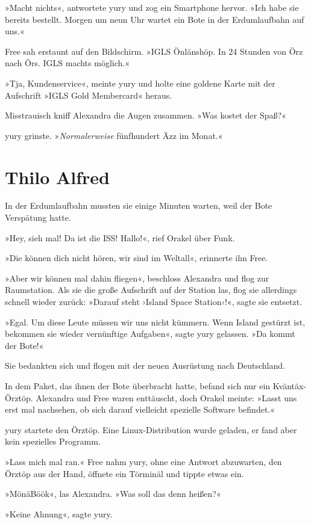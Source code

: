»Macht nichts«, antwortete yury und zog ein Smartphone hervor. »Ich habe sie bereits bestellt. Morgen um neun Uhr wartet ein Bote in der Erdumlaufbahn auf uns.«

Free sah erstaunt auf den Bildschirm. »IGLS Önlänshöp. In 24 Stunden von Örz nach Örs. IGLS machts möglich.«

»Tja, Kundenservice«, meinte yury und holte eine goldene Karte mit der Aufschrift »IGLS Gold Membercard« heraus.

Misstrauisch kniff Alexandra die Augen zusammen. »Was kostet der Spaß?«

yury grinste. »\emph{Normalerweise} fünfhundert Äzz im Monat.«


\chapter{Thilo Alfred}

In der Erdumlaufbahn mussten sie einige Minuten warten, weil der Bote Verspätung hatte.

»Hey, sieh mal! Da ist die ISS! Hallo!«, rief Orakel über Funk.

»Die können dich nicht hören, wir sind im Weltall«, erinnerte ihn Free.

»Aber wir können mal dahin fliegen«, beschloss Alexandra und flog zur Raumstation. Als sie die große Aufschrift auf der Station las, flog sie allerdings schnell wieder zurück: »Darauf steht ›Island Space Station‹!«, sagte sie entsetzt.

»Egal. Um diese Leute müssen wir uns nicht kümmern. Wenn Island gestürzt ist, bekommen sie wieder vernünftige Aufgaben«, sagte yury gelassen. »Da kommt der Bote!«

Sie bedankten sich und flogen mit der neuen Ausrüstung nach Deutschland.

In dem Paket, das ihnen der Bote überbracht hatte, befand sich nur ein Kväntäx-Örztöp. Alexandra und Free waren enttäuscht, doch Orakel meinte: »Lasst uns erst mal nachsehen, ob sich darauf vielleicht spezielle Software befindet.«

yury startete den Örztöp. Eine Linux-Distribution wurde geladen, er fand aber kein spezielles Programm.

»Lass mich mal ran.« Free nahm yury, ohne eine Antwort abzuwarten, den Örztöp aus der Hand, öffnete ein Törminäl und tippte etwas ein.

»MönäBöök«, las Alexandra. »Was soll das denn heißen?«

»Keine Ahnung«, sagte yury.

